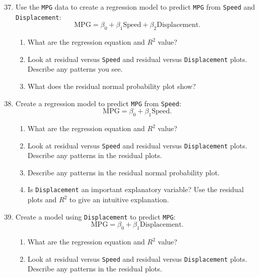 \documentclass[
]{report}
\begin{document}
\begin{enumerate}
  \setcounter{enumi}{36}

  \item Use the \texttt{MPG} data to create a regression model to predict \texttt{MPG} from \texttt{Speed} and \texttt{Displacement}:  
  \[
  \mathrm{MPG} = \beta_0 + \beta_1 \mathrm{Speed} + \beta_2 \mathrm{Displacement}.
  \]
  \begin{enumerate}
    \item What are the regression equation and $\scriptstyle {R}^2$ value?
    \item Look at residual versus \texttt{Speed} and residual versus \texttt{Displacement} plots. Describe any patterns you see.
    \item What does the residual normal probability plot show?
  \end{enumerate}

  \item Create a regression model to predict \texttt{MPG} from \texttt{Speed}:  
  \[
  \mathrm{MPG} = \beta_0 + \beta_1 \mathrm{Speed}.
  \]
  \begin{enumerate}
    \item What are the regression equation and $\scriptstyle {R}^2$ value?
    \item Look at residual versus \texttt{Speed} and residual versus \texttt{Displacement} plots. Describe any patterns in the residual plots.
    \item Describe any patterns in the residual normal probability plot.
    \item Is \texttt{Displacement} an important explanatory variable? Use the residual plots and $\scriptstyle {R}^2$ to give an intuitive explanation.
  \end{enumerate}

  \item Create a model using \texttt{Displacement} to predict \texttt{MPG}:  
  \[
  \mathrm{MPG} = \beta_0 + \beta_1 \mathrm{Displacement}.
  \]
  \begin{enumerate}
    \item What are the regression equation and $\scriptstyle {R}^2$ value?
    \item Look at residual versus \texttt{Speed} and residual versus \texttt{Displacement} plots. Describe any patterns in the residual plots.
  \end{enumerate}


\end{enumerate}
\end{document}
